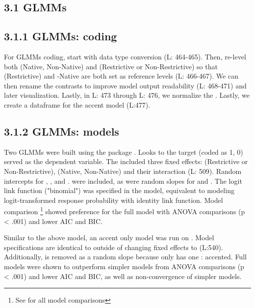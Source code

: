 \subsection{3.1 GLMMs}
\subsection{3.1.1 GLMMs: coding}
For GLMMs coding, start with data type conversion (L: 464-465). Then, re-level both (Native, Non-Native) and (Restrictive or Non-Restrictive) so that (Restrictive) and -Native are both set as reference levels (L: 466-467).  We can then rename the contrasts to improve model output readability (L: 468-471) and later visualization. Lastly, in L: 473 through L: 476, we normalize the . Lastly, we create a dataframe for the accent model (L:477).



\subsection{3.1.2 GLMMs: models}

Two GLMMs were built using the  package \parencite{Bates2014-eq}. Looks to the target (coded as 1, 0) served as the dependent variable. The  included three fixed effects:  (Restrictive or Non-Restrictive), (Native, Non-Native) and their interaction (L: 509). Random intercepts for ,
, and
.
 were included, as were random slopes for  and . The logit link function ("binomial") was specified in the model, equivalent to modeling logit-transformed response probability with identity link function. Model comparison \footnote{See  for all model comparisons} showed preference for the full model with ANOVA comparisons (p < .001) and lower AIC and BIC. 



Similar to the above model, an accent only model was run on . Model specifications are identical to  outside of changing fixed effects to  (L:540). Additionally,  is removed as a random slope because  only has one : accented. Full models were shown to outperform simpler models from  ANOVA comparisons (p < .001) and lower AIC and BIC, as well as non-convergence of simpler models. 

